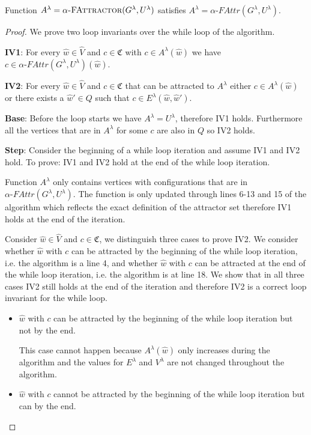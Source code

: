 \begin{theorem}
Function $A^\lambda = \textsc{$\alpha$-FAttractor}(G^\lambda,U^\lambda)$ satisfies $A^\lambda = \alpha\textit{-FAttr}(G^\lambda,U^\lambda)$.
	\begin{proof} We prove two loop invariants over the while loop of the algorithm.
		
		\textbf{IV1}: For every $\hat{w} \in \hat{V}$ and $c \in \mathfrak{C}$ with $c \in A^\lambda(\hat{w})$ we have $c \in \alpha\textit{-FAttr}(G^\lambda,U^\lambda)(\hat{w})$.
		
		\textbf{IV2}: For every $\hat{w} \in \hat{V}$ and $c \in \mathfrak{C}$ that can be attracted to $A^\lambda$ either $c \in A^\lambda(\hat{w})$ or there exists a $\hat{w}' \in Q$ such that $c \in E^\lambda(\hat{w},\hat{w}')$.
		
		\textbf{Base}: Before the loop starts we have $A^\lambda = U^\lambda$, therefore IV1 holds. Furthermore all the vertices that are in $A^\lambda$ for some $c$ are also in $Q$ so IV2 holds.
		
		\textbf{Step}: Consider the beginning of a while loop iteration and assume IV1 and IV2 hold. To prove: IV1 and IV2 hold at the end of the while loop iteration.
		
		Function $A^\lambda$ only contains vertices with configurations that are in $\alpha\textit{-FAttr}(G^\lambda,U^\lambda)$. The function is only updated through lines 6-13 and 15 of the algorithm which reflects the exact definition of the attractor set therefore IV1 holds at the end of the iteration.
		
		Consider $\hat{w} \in \hat{V}$ and $c \in \mathfrak{C}$, we distinguish three cases to prove IV2. We consider whether $\hat{w}$ with $c$ can be attracted by the beginning of the while loop iteration, i.e. the algorithm is a line 4, and whether $\hat{w}$ with $c$ can be attracted at the end of the while loop iteration, i.e. the algorithm is at line 18. We show that in all three cases IV2 still holds at the end of the iteration and therefore IV2 is a correct loop invariant for the while loop.
		\begin{itemize}
			\item $\hat{w}$ with $c$ can be attracted by the beginning of the while loop iteration but not by the end.
			
			This case cannot happen because $A^\lambda(\hat{w})$ only increases during the algorithm and the values for $E^\lambda$ and $V^\lambda$ are not changed throughout the algorithm.
			\item $\hat{w}$ with $c$ cannot be attracted by the beginning of the while loop iteration but can by the end.
			

\end{itemize}
\end{proof}
\end{theorem}
